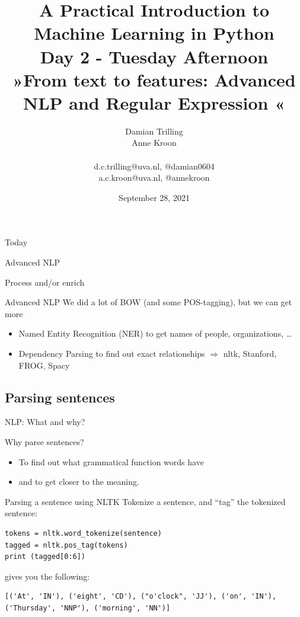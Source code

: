 \documentclass[compress]{beamer}
\title[Big Data and Automated Content Analysis]{\textbf{A Practical Introduction to Machine Learning in Python} \\Day 2 - Tuesday Afternoon \\ »From text to features: Advanced NLP and Regular Expression «}
\author[Damian Trilling, Anne Kroon]{Damian Trilling \\ Anne Kroon \\ ~ \\ \footnotesize{d.c.trilling@uva.nl, @damian0604 \\a.c.kroon@uva.nl, @annekroon} \\}
\date{September 28, 2021}
\institute[Gesis]{Gesis}
\begin{document}
	
	\begin{frame}{}
		\titlepage
	\end{frame}
	
	\begin{frame}{Today}
		\tableofcontents
	\end{frame}


\begin{section}{Advanced NLP}
	
	\begin{frame}{Process and/or enrich}
	\begin{block}{Advanced NLP}
		We did a lot of BOW (and some POS-tagging), but we can get more
		\begin{itemize}
			\item Named Entity Recognition (NER) to get names of people, organizations, \ldots
			\item Dependency Parsing to find out exact relationships
			$\Rightarrow$ nltk, Stanford, FROG, Spacy
		\end{itemize}
	\end{block}
\end{frame}


%


\subsection{Parsing sentences}
\begin{frame}{NLP: What and why?}
\begin{block}{Why parse sentences?}
\begin{itemize}
	\item To find out what grammatical function words have
	\item and to get closer to the meaning.
\end{itemize}
\end{block}
\end{frame}



\begin{frame}[fragile]{Parsing a sentence using NLTK}
Tokenize a sentence, and ``tag'' the tokenized sentence:
\begin{lstlisting}
tokens = nltk.word_tokenize(sentence)
tagged = nltk.pos_tag(tokens)
print (tagged[0:6])
\end{lstlisting}
gives you the following:
\begin{lstlisting}
[('At', 'IN'), ('eight', 'CD'), ("o'clock", 'JJ'), ('on', 'IN'),
('Thursday', 'NNP'), ('morning', 'NN')]
\end{lstlisting}


\end{frame}
\end{section}
\end{document}
